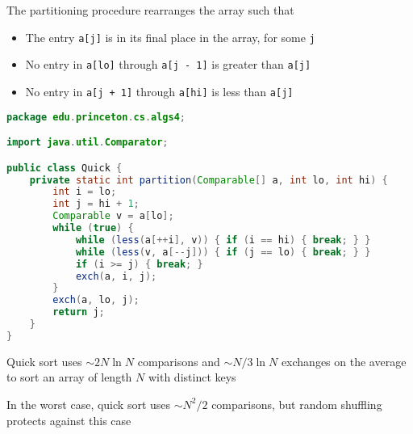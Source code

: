 \documentclass[8pt,a4paper,compress]{beamer}
\begin{document}
\begin{frame}[fragile]
\pause

The partitioning procedure rearranges the array such that
\begin{itemize}
\item The entry \lstinline{a[j]} is in its final place in the array, for some \lstinline{j}
\item No entry in \lstinline{a[lo]} through \lstinline{a[j - 1]} is greater than \lstinline{a[j]}
\item No entry in \lstinline{a[j + 1]} through \lstinline{a[hi]} is less than \lstinline{a[j]}
\end{itemize}

\pause
\bigskip

\begin{lstlisting}[language=Java]
package edu.princeton.cs.algs4;

import java.util.Comparator;

public class Quick {
    private static int partition(Comparable[] a, int lo, int hi) {
        int i = lo;
        int j = hi + 1;
        Comparable v = a[lo];
        while (true) { 
            while (less(a[++i], v)) { if (i == hi) { break; } }
            while (less(v, a[--j])) { if (j == lo) { break; } }
            if (i >= j) { break; }
            exch(a, i, j);
        }
        exch(a, lo, j);
        return j;
    }
}
\end{lstlisting}
\end{frame}

\begin{frame}[fragile]
\pause

Trace of partition operation
\begin{center}
}
\end{center}
\end{frame}

\begin{frame}[fragile]
\pause

Quick sort uses $\sim 2N\ln N$ comparisons and $\sim N/3\ln N$ exchanges on the average to sort an array of length $N$ with distinct keys

\pause
\bigskip

In the worst case, quick sort uses $\sim N^2/2$ comparisons, but random shuffling protects against this case
\end{frame}
\end{document}

